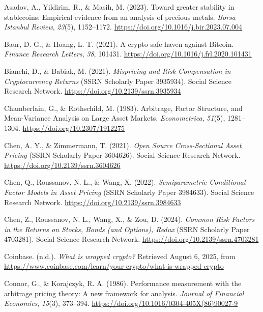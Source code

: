 \documentclass[
  12pt,
  a4paper,
  openany]{scrbook}
\newlength{\cslhangindent}
\newenvironment{CSLReferences}[2] %
 {\begin{list}{}{%
  \setlength{\itemindent}{0pt}
  \setlength{\leftmargin}{0pt}
  \setlength{\parsep}{0pt}
  \ifodd #1
   \setlength{\leftmargin}{\cslhangindent}
   \setlength{\itemindent}{-1\cslhangindent}
  \fi
  \setlength{\itemsep}{#2\baselineskip}}}
 {\end{list}}
\begin{document}
\label{refs}
\begin{CSLReferences}{1}{0}
Asadov, A., Yildirim, R., \& Masih, M. (2023). Toward greater stability
in stablecoins: Empirical evidence from an analysis of precious metals.
\emph{Borsa Istanbul Review}, \emph{23}(5), 1152--1172.
\url{https://doi.org/10.1016/j.bir.2023.07.004}

Baur, D. G., \& Hoang, L. T. (2021). A crypto safe haven against
Bitcoin. \emph{Finance Research Letters}, \emph{38}, 101431.
\url{https://doi.org/10.1016/j.frl.2020.101431}

Bianchi, D., \& Babiak, M. (2021). \emph{Mispricing and Risk
Compensation in Cryptocurrency Returns} (SSRN Scholarly Paper 3935934).
Social Science Research Network.
\url{https://doi.org/10.2139/ssrn.3935934}

Chamberlain, G., \& Rothschild, M. (1983). Arbitrage, Factor Structure,
and Mean-Variance Analysis on Large Asset Markets. \emph{Econometrica},
\emph{51}(5), 1281--1304. \url{https://doi.org/10.2307/1912275}

Chen, A. Y., \& Zimmermann, T. (2021). \emph{Open Source Cross-Sectional
Asset Pricing} (SSRN Scholarly Paper 3604626). Social Science Research
Network. \url{https://doi.org/10.2139/ssrn.3604626}

Chen, Q., Roussanov, N. L., \& Wang, X. (2022). \emph{Semiparametric
Conditional Factor Models in Asset Pricing} (SSRN Scholarly Paper
3984633). Social Science Research Network.
\url{https://doi.org/10.2139/ssrn.3984633}

Chen, Z., Roussanov, N. L., Wang, X., \& Zou, D. (2024). \emph{Common
Risk Factors in the Returns on Stocks, Bonds (and Options), Redux} (SSRN
Scholarly Paper 4703281). Social Science Research Network.
\url{https://doi.org/10.2139/ssrn.4703281}

Coinbase. (n.d.). \emph{What is wrapped crypto?} Retrieved August 6,
2025, from
\url{https://www.coinbase.com/learn/your-crypto/what-is-wrapped-crypto}

Connor, G., \& Korajczyk, R. A. (1986). Performance measurement with the
arbitrage pricing theory: A new framework for analysis. \emph{Journal of
Financial Economics}, \emph{15}(3), 373--394.
\url{https://doi.org/10.1016/0304-405X(86)90027-9}


\end{CSLReferences}
\end{document}
